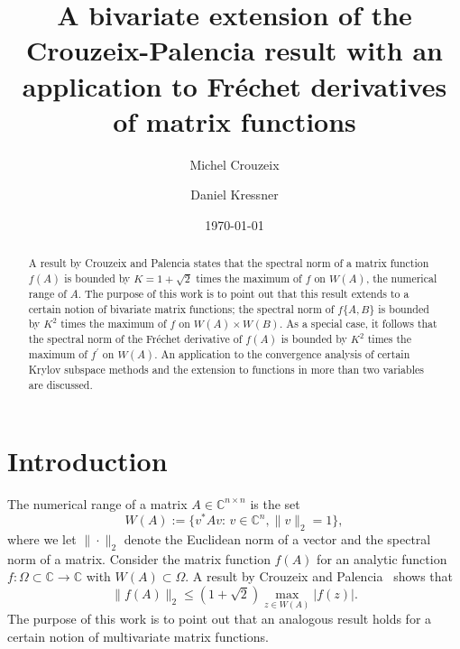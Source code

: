 \documentclass[11pt,a4paper]{amsart}
\title[A bivariate extension of the Crouzeix-Palencia result]{A bivariate extension of the Crouzeix-Palencia result with an application to Fr\'echet derivatives of matrix functions}
\author[M. Crouzeix \and D. Kressner]{Michel Crouzeix}
\author[]{Daniel Kressner}
\date{\today}
\newcommand{\C}{{\mathbb C}}
\begin{document}
\maketitle

\begin{abstract}
A result by Crouzeix and Palencia states that the spectral norm of a matrix function $f(A)$ is bounded by $K = 1+\sqrt{2}$ times the maximum of $f$ on $W(A)$, the numerical range of $A$. The purpose of this work is to point out that this result extends to a certain notion of bivariate matrix functions; the spectral norm of $f\{A,B\}$ 
is bounded by $K^2$ times the maximum of $f$ on $W(A)\times W(B)$. As a special case, it follows that the spectral norm of the Fr\'echet derivative of $f(A)$ is bounded by 
$K^2$ times the maximum of $f^\prime$ on $W(A)$. An application to the convergence analysis of certain Krylov subspace methods and the extension to functions in more than two variables are discussed. 
\end{abstract}

\section{Introduction}

The numerical range of a matrix $A\in \C^{n \times n}$ is the set 
\[
 W(A) := \{ v^* A v:\, v \in \C^n, \|v\|_2 = 1\},
\]
where we let $\|\cdot\|_2$ denote the Euclidean norm of a vector and the spectral norm of a matrix.
Consider the matrix function $f(A)$ for an analytic function $f: \Omega \subset \C \to \C$ with $W(A) \subset \Omega$.
A result by Crouzeix and Palencia~\cite{CrouzeixPalencia2017} shows that
\begin{equation} \label{eq:scalarcrouzeixpalencia}
 \|f(A)\|_2 \le (1+\sqrt{2}) \max_{z \in W(A)} |f(z)|.
\end{equation}
The purpose of this work is to point out that an analogous result holds for a certain notion of multivariate matrix functions.
\end{document}
